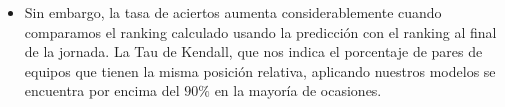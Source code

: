 \begin{itemize}
	\item Sin embargo, la tasa de aciertos aumenta considerablemente cuando comparamos el ranking calculado usando la predicción con el ranking al final de la jornada. La Tau de Kendall, que nos indica el porcentaje de pares de equipos que tienen la misma posición relativa, aplicando nuestros modelos se encuentra por encima del $90\%$ en la mayoría de ocasiones.
\end{itemize}